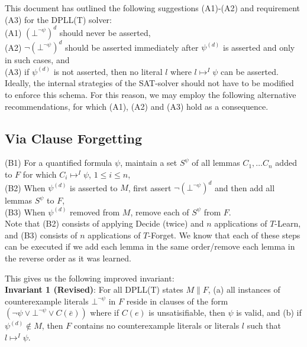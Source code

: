 \documentclass{llncs}
\begin{document}
This document has outlined the following suggestions (A1)-(A2) and requirement (A3) for the DPLL(T) solver: \\

\noindent (A1) $(\bot^{\neg \psi})^d$ should never be asserted, \\
(A2) $\neg (\bot^{\neg \psi})^d$ should be asserted immediately after $\psi^{(d)}$ is asserted and only in such cases, and \\
(A3) if $\psi^{(d)}$ is not asserted, then no literal $l$ where $l \mapsto^I \psi$ can be asserted. \\

Ideally, the internal strategies of the SAT-solver should not have to be modified to enforce this schema.
For this reason, we may employ the following alternative recommendations, for which (A1), (A2) and (A3) hold as a consequence.

\subsection{Via Clause Forgetting}

\noindent (B1) For a quantified formula $\psi$, maintain a set $S^\psi$ of all lemmas $C_1, \ldots C_n$ added to $F$ for which $C_i \mapsto^I \psi$, $1 \leq i \leq n$, \\
(B2) When $\psi^{(d)}$ is asserted to $M$, first assert $\neg (\bot^{\neg \psi})^d$ and then add all lemmas $S^\psi$ to $F$, \\
(B3) When $\psi^{(d)}$ removed from $M$, remove each of $S^\psi$ from $F$. \\

Note that (B2) consists of applying Decide (twice) and $n$ applications of $T$-Learn, and (B3) consists of $n$ applications of $T$-Forget.
We know that each of these steps can be executed if we add each lemma in the same order/remove each lemma in the reverse order as it was learned.

This gives us the following improved invariant: \\

{\bf Invariant 1 (Revised)}:
For all DPLL(T) states $M \parallel F$,
(a) all instances of counterexample literals $\bot^{\neg \psi}$ in $F$ reside in clauses of the form $( \neg \psi \vee \bot^{\neg \psi} \vee C(\bar{e}) )$ where if $C(e)$ is unsatisifiable, then $\psi$ is valid, and
(b) if $\psi^{(d)} \not\in M$, then $F$ contains no counterexample literals or literals $l$ such that $l \mapsto^I \psi$. \\
\end{document}
